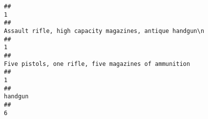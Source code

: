 \documentclass[
]{article}
\begin{document}
\begin{verbatim}
##                                                                                                                                                                                                                                                                                                                                                                                                     1 
##                                                                                                                                                                                                                                                                                                                                             Assault rifle, high capacity magazines, antique handgun\n 
##                                                                                                                                                                                                                                                                                                                                                                                                     1 
##                                                                                                                                                                                                                                                                                                                                                 Five pistols, one rifle, five magazines of ammunition 
##                                                                                                                                                                                                                                                                                                                                                                                                     1 
##                                                                                                                                                                                                                                                                                                                                                                                               handgun 
##                                                                                                                                                                                                                                                                                                                                                                                                     6 

\end{verbatim}
\end{document}
